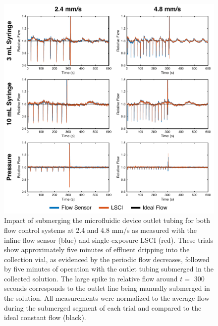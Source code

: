 \documentclass{article}
\begin{document}
\begin{figure}
    \includegraphics[width=\textwidth]{FigureS1.pdf}
    \caption {
        Impact of submerging the microfluidic device outlet tubing for both flow control systems at 2.4 and 4.8 mm/s as measured with the inline flow sensor (blue) and single-exposure LSCI (red). These trials show approximately five minutes of effluent dripping into the collection vial, as evidenced by the periodic flow decreases, followed by five minutes of operation with the outlet tubing submerged in the collected solution. The large spike in relative flow around $t = $ 300 seconds corresponds to the outlet line being manually submerged in the solution. All measurements were normalized to the average flow during the submerged segment of each trial and compared to the ideal constant flow (black).
    }
    \label{fig:supplement_outlet}
\end{figure}
\end{document}
